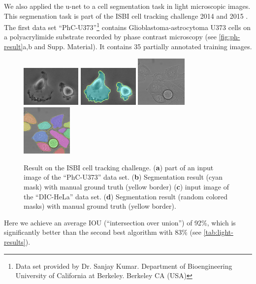 \documentclass{llncs}
\begin{document}
We also applied the u-net to a cell segmentation task in light microscopic images. This segmenation task is part of the ISBI cell tracking challenge 2014 and 2015 \cite{Maska2014,cell-tracking-webpage}. The first data set ``PhC-U373''\footnote{Data set provided by Dr. Sanjay Kumar. Department of Bioengineering University of California at Berkeley. Berkeley CA (USA)} contains Glioblastoma-astrocytoma U373 cells on a polyacrylimide substrate recorded by phase contrast microscopy (see \autoref{fig:ph-result}a,b and Supp. Material). It contains 35 partially annotated training images.
\begin{figure}[tbp]
  \centering
{}\includegraphics[height=20mm]{PhC-C2DH-U373-crop1}
   \includegraphics[height=20mm]{PhC-C2DH-U373-crop1-result}
   \includegraphics[height=25mm]{DIC-HeLa-1}
   \includegraphics[height=25mm]{DIC-HeLa-1_result}
\caption{Result on the ISBI cell tracking challenge. (\textbf{a}) part of an input image of the ``PhC-U373'' data set. (\textbf{b}) Segmentation result (cyan mask) with manual ground truth (yellow border) (\textbf{c}) input image of the ``DIC-HeLa'' data set. (\textbf{d}) Segmentation result (random colored masks) with manual ground truth (yellow border). }
\label{fig:ph-result}
\end{figure}
Here we achieve an average IOU (``intersection over union'') of 92\%, which is significantly better than the second best algorithm  with 83\% (see \autoref{tab:light-results}).
\end{document}
